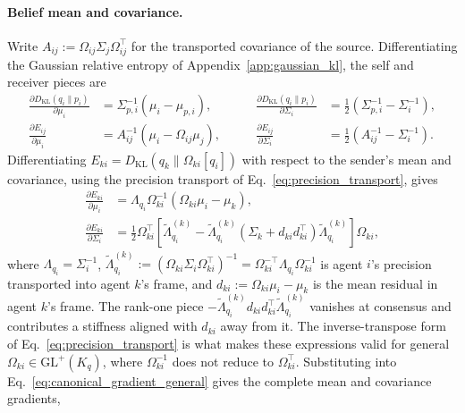 \paragraph{Belief mean and covariance.}
Write $A_{ij} := \Omega_{ij}\Sigma_j\Omega_{ij}^\top$ for the transported covariance of the source. Differentiating the Gaussian relative entropy of Appendix~\ref{app:gaussian_kl}, the self and receiver pieces are
\begin{equation}
\begin{aligned}
\frac{\partial D_{\mathrm{KL}}(q_i \| p_i)}{\partial \mu_i} &= \Sigma_{p,i}^{-1}(\mu_i - \mu_{p,i}),
&\qquad
\frac{\partial D_{\mathrm{KL}}(q_i \| p_i)}{\partial \Sigma_i} &= \frac{1}{2}\left(\Sigma_{p,i}^{-1} - \Sigma_i^{-1}\right), \\
\frac{\partial E_{ij}}{\partial \mu_i} &= A_{ij}^{-1}(\mu_i - \Omega_{ij}\mu_j),
&\qquad
\frac{\partial E_{ij}}{\partial \Sigma_i} &= \frac{1}{2}\left(A_{ij}^{-1} - \Sigma_i^{-1}\right).
\end{aligned}
\end{equation}
Differentiating $E_{ki} = D_{\mathrm{KL}}(q_k \| \Omega_{ki}[q_i])$ with respect to the sender's mean and covariance, using the precision transport of Eq.~\eqref{eq:precision_transport}, gives
\begin{align}
\frac{\partial E_{ki}}{\partial \mu_i} &= \Lambda_{q_i}\Omega_{ki}^{-1}\left(\Omega_{ki}\mu_i - \mu_k\right), \\
\frac{\partial E_{ki}}{\partial \Sigma_i} &= \frac{1}{2}\Omega_{ki}^{\top}\left[\tilde{\Lambda}_{q_i}^{(k)} - \tilde{\Lambda}_{q_i}^{(k)}\left(\Sigma_k + d_{ki}d_{ki}^{\top}\right)\tilde{\Lambda}_{q_i}^{(k)}\right]\Omega_{ki},
\end{align}
where $\Lambda_{q_i} = \Sigma_i^{-1}$, $\tilde{\Lambda}_{q_i}^{(k)} := (\Omega_{ki}\Sigma_i\Omega_{ki}^{\top})^{-1} = \Omega_{ki}^{-\top}\Lambda_{q_i}\Omega_{ki}^{-1}$ is agent $i$'s precision transported into agent $k$'s frame, and $d_{ki} := \Omega_{ki}\mu_i - \mu_k$ is the mean residual in agent $k$'s frame. The rank-one piece $-\tilde{\Lambda}_{q_i}^{(k)}d_{ki}d_{ki}^{\top}\tilde{\Lambda}_{q_i}^{(k)}$ vanishes at consensus and contributes a stiffness aligned with $d_{ki}$ away from it. The inverse-transpose form of Eq.~\eqref{eq:precision_transport} is what makes these expressions valid for general $\Omega_{ki} \in \mathrm{GL}^{+}(K_q)$, where $\Omega_{ki}^{-1}$ does not reduce to $\Omega_{ki}^{\top}$. Substituting into Eq.~\eqref{eq:canonical_gradient_general} gives the complete mean and covariance gradients,
